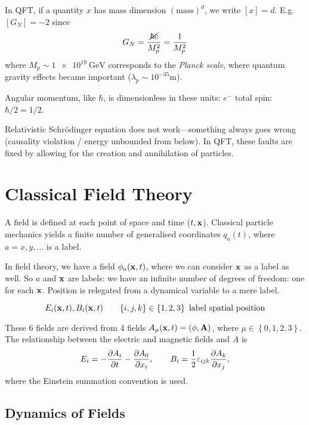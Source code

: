 In QFT, if a quantity $x$ has mass dimension $(\text{mass})^d$, we write $[x] = d$. E.g.~$[G_N] = -2$ since 
\begin{equation}
  G_N = \frac{\cancel{\hbar c}}{M_p^2} = \frac{1}{M_p^2}
\end{equation}
where $M_p \sim \SI{1e19}{\giga\electronvolt}$ corresponds to the \emph{Planck scale}, where quantum gravity effects became important ($\lambda_p \sim 10^{-35}$m).

Angular momentum, like $\hbar$, is dimensionless in these units: $e^-$ total spin: $\hbar/2 = 1/2$.

Relativistic Schrödinger equation does not work---something always goes wrong (causality violation / energy unbounded from below). In QFT, these faults are fixed by allowing for the creation and annihilation of particles.

\chapter{Classical Field Theory}%
\label{cha:classical_field_theory}

A field is defined at each point of space and time ($t, \vb x$). Classical particle mechanics yields a finite number of generalised coordinates $q_a(t)$, where $a = x, y, \dots$ is a label.

In field theory, we have a field $\phi_a(\vb x, t)$, where we can consider $\vb x$ as a label as well.
So $a$ and $\vb x$ are labels: we have an infinite number of degrees of freedom: one for each $\vb x$.
Position is relegated from a dynamical variable to a mere label.


\begin{example}[Electromagnetism]
\begin{equation}
  E_i (\vb x, t), B_i(\vb x, t) \qquad \{i, j, k\} \in \left\{ 1, 2, 3 \right\} \text{ label spatial position}
\end{equation}

These 6 fields are derived from 4 fields $A_\mu(\vb x, t) = (\phi, \vb A)$, where $\mu \in \left\{ 0, 1, 2, 3 \right\}$.
The relationship between the electric and magnetic fields and $A$ is
\begin{equation}
  E_i = -\pdv{A_i}{t} - \pdv{A_0}{x_i}, \qquad B_i = \frac{1}{2} \varepsilon_{ijk} \pdv{A_k}{x_j},
\end{equation}
where the Einstein summation convention is used.
\end{example}

\section{Dynamics of Fields}%
\label{sec:dynamics}

